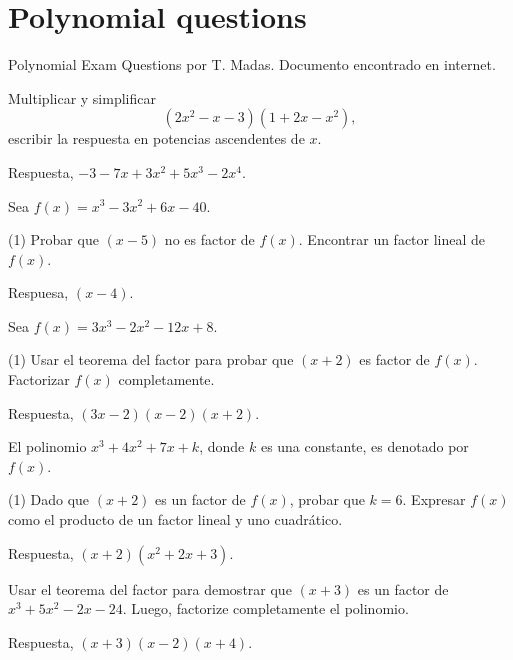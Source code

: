 \section{Polynomial questions}

Polynomial Exam Questions por T. Madas.
Documento encontrado en internet.

\begin{exercise}[*]
    Multiplicar y simplificar
    \[
        (2x^2 - x - 3)(1 + 2x - x^2),
    \]
    escribir la respuesta en potencias ascendentes de $x$.

    Respuesta, $\boxed{-3 - 7x + 3x^2 + 5x^3 - 2x^4}$.
\end{exercise}

\begin{exercise}[*]
    Sea $f(x) = x^3 - 3x^2 + 6x - 40$.
    \begin{tasks}[label=\alph*.](1)
        \task Probar que $(x - 5)$ no es factor de $f(x)$.
        \task Encontrar un factor lineal de $f(x)$.
    \end{tasks}
    Respuesa, $\boxed{(x - 4)}$.
\end{exercise}

\begin{exercise}
    Sea $f(x) = 3x^3 - 2x^2 - 12x + 8$.
    \begin{tasks}[label=\alph*.](1)
        \task Usar el teorema del factor para probar que $(x + 2)$ es factor de $f(x)$.
        \task Factorizar $f(x)$ completamente.
    \end{tasks}
    Respuesta, $\boxed{(3x - 2)(x - 2)(x + 2)}$.
\end{exercise}

\begin{exercise}
    El polinomio $x^3 + 4x^2 + 7x + k$, donde $k$ es una constante, es denotado por $f(x)$.
    \begin{tasks}[label=\alph*.](1)
        \task Dado que $(x + 2)$ es un factor de $f(x)$, probar que $k = 6$.
        \task Expresar $f(x)$ como el producto de un factor lineal y uno cuadrático.
    \end{tasks}
    Respuesta, $\boxed{(x + 2)(x^2 + 2x + 3)}$.
\end{exercise}

\begin{exercise}
    Usar el teorema del factor para demostrar que $(x + 3)$ es un factor de $x^3 + 5x^2 - 2x - 24$.
    Luego, factorize completamente el polinomio.

    Respuesta, $\boxed{(x + 3)(x - 2)(x + 4)}$.
\end{exercise}

